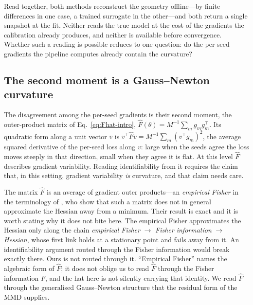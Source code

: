 \documentclass[10pt,twocolumn]{article}
\newcommand{\Fhat}{\hat{F}}
\begin{document}
Read together, both methods reconstruct the geometry offline---by finite differences
in one case, a trained surrogate in the other---and both return a single snapshot at
the fit. Neither reads the true model at the cost of the gradients the calibration
already produces, and neither is available before convergence. Whether such a
reading is possible reduces to one question: do the per-seed gradients the pipeline
computes already contain the curvature?

\subsection{The second moment is a Gauss--Newton curvature}
\label{sec:bg:opg}

The disagreement among the per-seed gradients is their second moment, the
outer-product matrix of Eq.~\eqref{eq:Fhat-intro},
$\Fhat(\theta) = M^{-1}\sum_m g_m g_m^\top$. Its quadratic form along a unit vector
$v$ is $v^\top \Fhat v = M^{-1}\sum_m (v^\top g_m)^2$, the average squared derivative
of the per-seed loss along $v$: large when the seeds agree the loss moves steeply in
that direction, small when they agree it is flat. At this level $\Fhat$ describes
gradient variability. Reading identifiability from it requires the claim that, in
this setting, gradient variability \emph{is} curvature, and that claim needs care.

The matrix $\Fhat$ is an average of gradient outer products---an \emph{empirical
Fisher} in the terminology of \citet{kunstner2019limitations}, who show that such a
matrix does not in general approximate the Hessian away from a minimum. Their result
is exact and it is worth stating why it does not bite here. The empirical Fisher
approximates the Hessian only along the chain \emph{empirical Fisher}
$\to$ \emph{Fisher information} $\to$ \emph{Hessian}, whose first link holds at a
stationary point and fails away from it. An identifiability argument routed through
the Fisher information would break exactly there. Ours is not routed through it.
``Empirical Fisher'' names the algebraic form of $\Fhat$; it does not oblige us to
read $\Fhat$ through the Fisher information $F$, and the hat here is not silently
carrying that identity. We read $\Fhat$ through the generalised Gauss--Newton
structure that the residual form of the MMD supplies.
\end{document}
